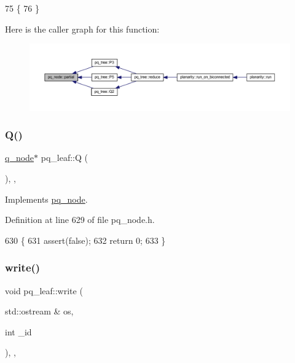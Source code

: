 \begin{DoxyCode}
75     \{
76     \}
\end{DoxyCode}
Here is the caller graph for this function\+:
\nopagebreak
\begin{figure}[H]
\begin{center}
\leavevmode
\includegraphics[width=350pt]{classpq__node_aa6830ab47a280f41fe61b7d2f8b508bb_icgraph}
\end{center}
\end{figure}
\mbox{\label{classpq__leaf_aa5816a18a112ab2e26cd971f4ab4aa8f}} 
\subsubsection{\texorpdfstring{Q()}{Q()}}
{\footnotesize\ttfamily \mbox{\hyperlink{classq__node}{q\+\_\+node}}$\ast$ pq\+\_\+leaf\+::Q (\begin{DoxyParamCaption}{ }\end{DoxyParamCaption})\hspace{0.3cm}{\ttfamily [inline]}, {\ttfamily [private]}, {\ttfamily [virtual]}}



Implements \mbox{\hyperlink{classpq__node_aeeefcfcd19dbe4ca94e190006e8dd484}{pq\+\_\+node}}.



Definition at line 629 of file pq\+\_\+node.\+h.


\begin{DoxyCode}
630     \{
631     assert(\textcolor{keyword}{false});
632     \textcolor{keywordflow}{return} 0;
633     \}
\end{DoxyCode}
\mbox{\label{classpq__leaf_a5072c4b54cb0ee3f906e1f44ec03cd79}} 
\subsubsection{\texorpdfstring{write()}{write()}}
{\footnotesize\ttfamily void pq\+\_\+leaf\+::write (\begin{DoxyParamCaption}\item[{std\+::ostream \&}]{os,  }\item[{int}]{\+\_\+id }\end{DoxyParamCaption})\hspace{0.3cm}{\ttfamily [inline]}, {\ttfamily [private]}, {\ttfamily [virtual]}}



